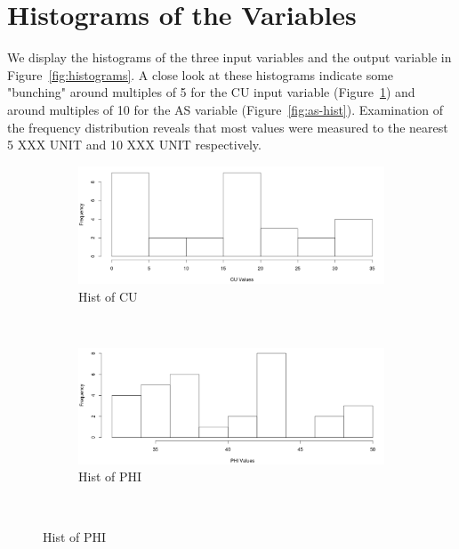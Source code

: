 \documentclass[a4paper,12pt, english]{article}
\begin{document}
\section{Histograms of the Variables}
We display the histograms of the three input variables and the output variable in Figure~\ref{fig:histograms}. A close look at these histograms indicate some "bunching" around multiples of 5 for the CU input variable (Figure~\ref{fig:cu-hist}) and around multiples of 10 for the AS variable (Figure~\ref{fig:as-hist}). Examination of the frequency distribution reveals that most values were measured to the nearest 5 XXX UNIT and 10 XXX UNIT respectively.
\begin{figure}[H]
        \centering
        \begin{subfigure}[b]{0.45\textwidth}
                \includegraphics[width=\textwidth]{cu-hist}
                \caption{Hist of CU}
                \label{fig:cu-hist}
        \end{subfigure}%
        ~ %
        \begin{subfigure}[b]{0.45\textwidth}
                \includegraphics[width=\textwidth]{phi-hist}
                \caption{Hist of PHI}
                \label{fig:phi-hist}
        \end{subfigure}
        ~ %

\end{figure}
\end{document}
